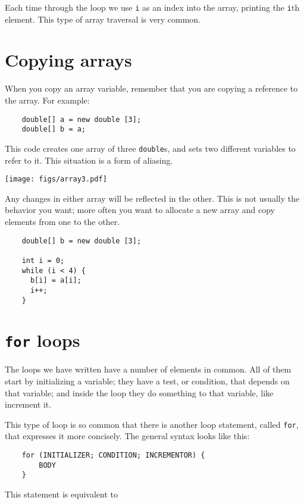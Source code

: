 \documentclass[12pt]{book}
\theoremstyle{definition}
\begin{document}

Each time through the loop we use {\tt i} as an index into
the array, printing the {\tt i}th element.  This type of
array traversal is very common.


\section{Copying arrays}

When you copy an array variable, remember that you are
copying a reference to the array.  For example:

\begin{lstlisting}
    double[] a = new double [3];
    double[] b = a;
\end{lstlisting}
%
This code creates one array of three {\tt double}s, and
sets two different variables to refer to it.
This situation is a form of aliasing.


\texttt{[image: figs/array3.pdf]}


Any changes in either array
will be reflected in the other.  This is not usually the
behavior you want; more often you want to
allocate a new array and copy elements from
one to the other.

\begin{lstlisting}
    double[] b = new double [3];

    int i = 0;
    while (i < 4) {
      b[i] = a[i];
      i++;
    }
\end{lstlisting}


\section{{\tt for} loops}

The loops we have written have a number of elements
in common.  All of them start by initializing a variable;
they have a test, or condition, that depends on that variable;
and inside the loop they do something to that variable,
like increment it.


This type of loop is so common that there is another
loop statement, called {\tt for}, that expresses it more
concisely.  The general syntax looks like this:

\begin{lstlisting}
    for (INITIALIZER; CONDITION; INCREMENTOR) {
        BODY
    }
\end{lstlisting}
%
This statement is equivalent to
\end{document}
